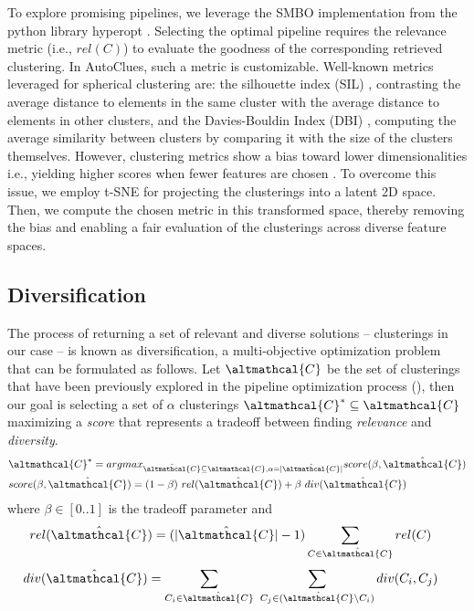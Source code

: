 To explore promising pipelines, we leverage the SMBO implementation from the python library hyperopt \cite{HyperOptICML13}.
Selecting the optimal pipeline requires the relevance metric (i.e., $rel(C)$) to evaluate the goodness of the corresponding retrieved clustering.
In AutoClues, such a metric is customizable.
Well-known metrics leveraged for spherical clustering are: the silhouette index (SIL) \cite{zhu2010clustering}, contrasting the average distance to elements in the same cluster with the average distance to elements in other clusters, and the Davies-Bouldin Index (DBI) \cite{dbi}, computing the average similarity between clusters by comparing it with the size of the clusters themselves.
However, clustering metrics show a bias toward lower dimensionalities i.e., yielding higher scores when fewer features are chosen \cite{lensen2017using,hancer2020new}.
To overcome this issue, we employ t-SNE \cite{van2008visualizing} for projecting the clusterings into a latent 2D space.
Then, we compute the chosen metric in this transformed space, thereby removing the bias and enabling a fair evaluation of the clusterings across diverse feature spaces.


\subsection{Diversification}
\label{clustering-ssec:diversification}

The process of returning a set of relevant and diverse solutions -- clusterings in our case -- is known as diversification, a multi-objective optimization problem that can be formulated as follows.
Let $\altmathcal{C}$ be the set of clusterings that have been previously explored in the pipeline optimization process (), then our goal is selecting a set of $\alpha$ clusterings $\altmathcal{C}^* \subseteq \altmathcal{C}$ maximizing a \textit{score} that represents a tradeoff between finding \textit{relevance} and \textit{diversity}.
\begin{align}\label{def:score}
&\altmathcal{C}^* = argmax_{\hat{\altmathcal{C}} \subseteq \altmathcal{C}, \alpha=|\hat{\altmathcal{C}}|} score(\beta, \hat{\altmathcal{C}})\\
&score(\beta, \hat{\altmathcal{C}}) = (1-\beta)~rel(\hat{\altmathcal{C}}) + \beta~div(\hat{\altmathcal{C}})
\end{align}
where $\beta \in [0.. 1]$ is the tradeoff parameter and
\begin{align}
rel(\hat{\altmathcal{C}}) &= (|\hat{\altmathcal{C}}|-1)\sum_{C \in \hat{\altmathcal{C}}} rel(C)
\label{def:rel}
\end{align}
\begin{align}
div(\hat{\altmathcal{C}}) &= \sum_{C_i \in \hat{\altmathcal{C}}}~\sum_{C_j \in (\hat{\altmathcal{C}} \setminus C_i)} div(C_i, C_j)
\label{def:div}
\end{align}

